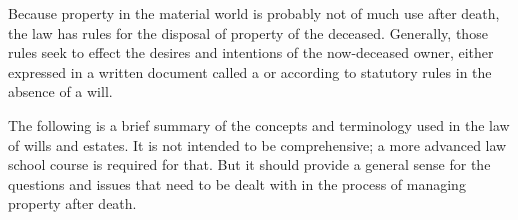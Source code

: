 Because property in the material world is probably not of much use after death,
the law has rules for the disposal of property of the deceased. Generally, those
rules seek to effect the desires and intentions of the now-deceased owner,
either expressed in a written document called a  or according to
statutory rules in the absence of a will.

The following is a brief summary of the concepts and terminology used in the law
of wills and estates. It is not intended to be comprehensive; a more advanced
law school course is required for that. But it should provide a general sense
for the questions and issues that need to be dealt with in the process of
managing property after death.


\replacestart{\item}{}

\replace\item\par
\replace\item\par
\replace\item\par
\replace\item\par
\replace\item\par
\replace\item\par
\replace\item\par
\replace\item\par
\replace\item\par

\replaceend{\end}{}

\endedit
